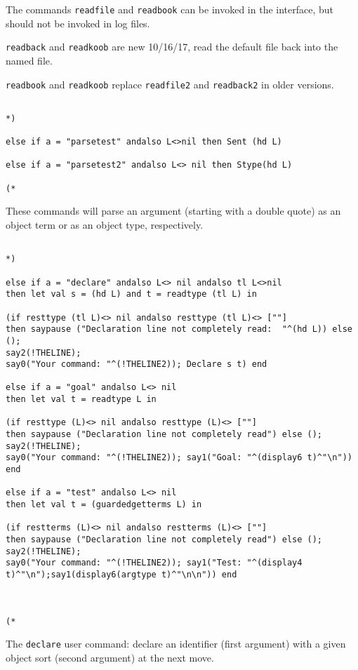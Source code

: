 \documentclass{article}
\begin{document}
The commands {\tt readfile} and {\tt readbook} can be invoked in the interface, but should
not be invoked in log files.

{\tt readback} and {\tt readkoob} are new 10/16/17, read the default file back into the named file.

{\tt readbook} and {\tt readkoob} replace {\tt readfile2} and {\tt readback2} in older versions.

\begin{verbatim}

*)

else if a = "parsetest" andalso L<>nil then Sent (hd L)

else if a = "parsetest2" andalso L<> nil then Stype(hd L)

(*

\end{verbatim}

These commands will parse an argument (starting with a double quote) as an object term or as an object type, respectively.

\begin{verbatim}

*)

else if a = "declare" andalso L<> nil andalso tl L<>nil 
then let val s = (hd L) and t = readtype (tl L) in 

(if resttype (tl L)<> nil andalso resttype (tl L)<> [""] 
then saypause ("Declaration line not completely read:  "^(hd L)) else ();
say2(!THELINE);
say0("Your command: "^(!THELINE2)); Declare s t) end

else if a = "goal" andalso L<> nil
then let val t = readtype L in 

(if resttype (L)<> nil andalso resttype (L)<> [""] 
then saypause ("Declaration line not completely read") else ();
say2(!THELINE);
say0("Your command: "^(!THELINE2)); say1("Goal: "^(display6 t)^"\n")) end

else if a = "test" andalso L<> nil
then let val t = (guardedgetterms L) in 

(if restterms (L)<> nil andalso restterms (L)<> [""] 
then saypause ("Declaration line not completely read") else ();
say2(!THELINE);
say0("Your command: "^(!THELINE2)); say1("Test: "^(display4 t)^"\n");say1(display6(argtype t)^"\n\n")) end



(*

\end{verbatim}

The {\tt declare} user command:  declare an identifier (first argument) with a given object sort
(second argument) at the next move.
\end{document}
